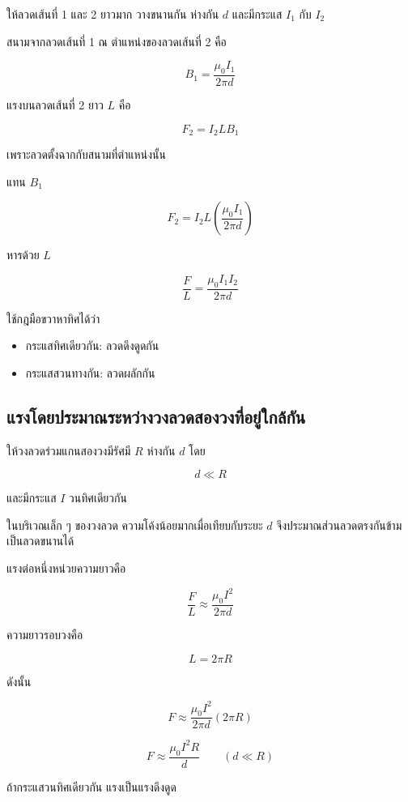 ให้ลวดเส้นที่ 1 และ 2 ยาวมาก วางขนานกัน ห่างกัน $d$ และมีกระแส $I_1$ กับ $I_2$

สนามจากลวดเส้นที่ 1 ณ ตำแหน่งของลวดเส้นที่ 2 คือ

\[
B_1=\frac{\mu_0 I_1}{2\pi d}
\]

แรงบนลวดเส้นที่ 2 ยาว $L$ คือ

\[
F_2=I_2LB_1
\]

เพราะลวดตั้งฉากกับสนามที่ตำแหน่งนั้น

แทน $B_1$

\[
F_2
=
I_2L
\left(
\frac{\mu_0 I_1}{2\pi d}
\right)
\]

หารด้วย $L$

\begin{tcolorbox}[title={แรงต่อหนึ่งหน่วยความยาวระหว่างลวดขนาน}]
\[
\boxed{
\frac{F}{L}
=
\frac{\mu_0 I_1I_2}{2\pi d}}
\]
\end{tcolorbox}

ใช้กฎมือขวาหาทิศได้ว่า

\begin{itemize}
    \item กระแสทิศเดียวกัน: ลวดดึงดูดกัน
    \item กระแสสวนทางกัน: ลวดผลักกัน
\end{itemize}

\subsection{แรงโดยประมาณระหว่างวงลวดสองวงที่อยู่ใกล้กัน}

ให้วงลวดร่วมแกนสองวงมีรัศมี $R$ ห่างกัน $d$ โดย

\[
d\ll R
\]

และมีกระแส $I$ วนทิศเดียวกัน

ในบริเวณเล็ก ๆ ของวงลวด ความโค้งน้อยมากเมื่อเทียบกับระยะ $d$ จึงประมาณส่วนลวดตรงกันข้ามเป็นลวดขนานได้

แรงต่อหนึ่งหน่วยความยาวคือ

\[
\frac{F}{L}
\approx
\frac{\mu_0 I^2}{2\pi d}
\]

ความยาวรอบวงคือ

\[
L=2\pi R
\]

ดังนั้น

\[
F
\approx
\frac{\mu_0 I^2}{2\pi d}
(2\pi R)
\]

\begin{tcolorbox}[title={แรงโดยประมาณระหว่างวงลวดใกล้กัน}]
\[
\boxed{
F\approx\frac{\mu_0 I^2R}{d}}
\qquad
(d\ll R)
\]

ถ้ากระแสวนทิศเดียวกัน แรงเป็นแรงดึงดูด
\end{tcolorbox}

